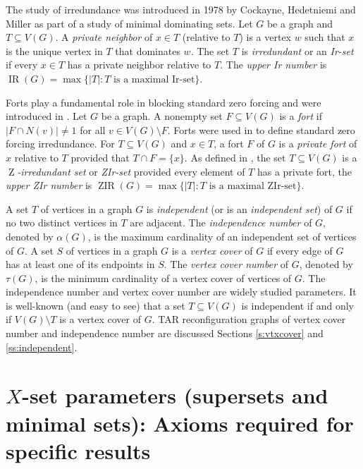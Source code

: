 \documentclass{article}
\numberwithin{figure}{section}
\numberwithin{table}{section}
\numberwithin{equation}{section}
\theoremstyle{definition}
\theoremstyle{definition}
\theoremstyle{definition}
\newcommand{\Z}{\operatorname{Z}}
\newcommand{\vc}{\tau}
\DeclareMathOperator{\ir}{ir}
\DeclareMathOperator{\IR}{IR}
\DeclareMathOperator{\zir}{zir}
\DeclareMathOperator{\ZIR}{ZIR}
\begin{document}
{The study of irredundance was introduced in 1978 by Cockayne, Hedetniemi and Miller \cite{CHM78} as part of a study of minimal dominating sets. 
 Let $G$ be a graph and $T\subseteq V(G)$. 
A \emph{private neighbor} of $x\in T$ (relative to $T$)  is a vertex $w$ such that $x$ is the unique vertex in $T$ that dominates $w$.  The set $T$ is \emph{irredundant} or an \emph{Ir-set} if every $x\in T$ has a private neighbor relative to $T$.  
The  \emph{upper Ir number} is $\IR(G) = \max\{|T|: T \text{ is a maximal Ir-set}\}$. %

Forts play a fundamental role in blocking standard zero forcing and were introduced in \cite{FH18}.  Let $G$ be a graph. A nonempty set $F\subseteq V(G)$ is a \emph{fort} if $|F\cap N(v)|\ne 1$ for all $v\in V(G)\setminus F$.  Forts were used in \cite{ZIR} to define standard zero forcing irredundance. For $T\subseteq V(G)$ and $x\in T$, a fort $F$ of $G$ is a \emph{private fort} of $x$ relative to $T$ provided that $T\cap F = \{x\}$. As defined in \cite{ZIR}, the set $T\subseteq V(G)$ is a \emph{$\Z$-irredundant set} or \emph{ZIr-set} provided every element of $T$ has a private  fort, the  \emph{upper ZIr number} is $\ZIR(G) = \max\{|T|: T \text{ is a maximal ZIr-set}\}$. %



 A set $T$ of vertices in a graph $G$ is \emph{independent} (or is an \emph{independent set}) of $G$ if no two distinct vertices in $T$ are adjacent.  The \emph{independence number} of $G$, denoted by $\alpha(G)$, is the maximum cardinality of an independent set of vertices of $G$. 
A set $S$ of vertices in a graph $G$ is a \emph{vertex cover} of $G$ if every edge of $G$ has at least one of its endpoints in $S$.  The \emph{vertex cover number} of $G$, denoted by $\vc(G)$, is the minimum cardinality of a vertex cover of vertices of $G$. The independence number and vertex cover number are widely studied parameters. It is
well-known (and easy to see) that a set $T\subseteq V(G)$ is independent if and only if $V(G)\setminus T$ is a vertex cover of $G$.  TAR  reconfiguration graphs of vertex cover number and independence number are discussed Sections \ref{s:vtxcover} and \ref{ss:independent}.




 \section{$X$-set parameters (supersets and minimal sets): Axioms required for specific results}\label{sec:proof-requirements}

}
\end{document}
